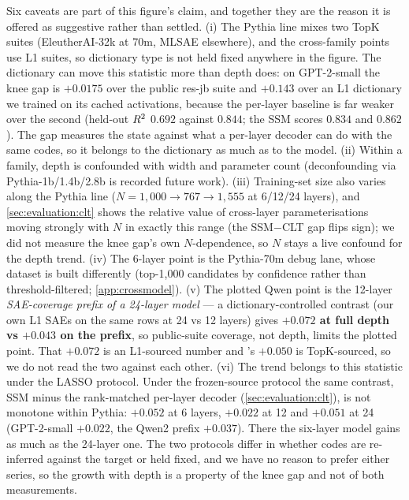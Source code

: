 Six caveats are part of this figure's claim, and together they are the reason
it is offered as suggestive rather than settled. (i) The Pythia line mixes two
TopK suites (EleutherAI-32k at 70m, MLSAE elsewhere), and the cross-family
points use L1 suites, so dictionary type is not held fixed anywhere in the
figure. The dictionary can move this statistic more than depth does: on
GPT-2-small the knee gap is $+0.0175$ over the public res-jb suite and
$+0.143$ over an L1 dictionary we trained on its cached activations, because
the per-layer baseline is far weaker over the second (held-out $R^2$ $0.692$
against $0.844$; the SSM scores $0.834$ and $0.862$). The gap measures the
state against what a per-layer decoder can do with the same codes, so it
belongs to the dictionary as much as to the model. (ii) Within a family, depth is
confounded with width and parameter count (deconfounding via
Pythia-1b/1.4b/2.8b is
recorded future work). (iii) Training-set size also varies along the Pythia
line ($N = 1{,}000 \to 767 \to 1{,}555$ at 6/12/24 layers), and
\cref{sec:evaluation:clt} shows the relative value of cross-layer
parameterisations moving strongly with $N$ in exactly this range (the
SSM$-$CLT gap flips sign); we did not measure the knee gap's own
$N$-dependence, so $N$ stays a live confound for the depth trend.
(iv) The 6-layer point is the Pythia-70m debug lane, whose dataset is built
differently (top-1{,}000 candidates by confidence rather than
threshold-filtered; \cref{app:crossmodel}). (v) The plotted Qwen point is the
12-layer \emph{SAE-coverage prefix of a 24-layer model} --- a
dictionary-controlled contrast (our own L1 SAEs on the same rows at 24 vs 12
layers) gives \textbf{$+0.072$ at full depth vs $+0.043$ on the prefix}, so
public-suite coverage, not depth, limits the plotted point. That $+0.072$ is
an L1-sourced number and \pythia{}'s $+0.050$ is TopK-sourced, so we do not
read the two against each other. (vi) The trend belongs to this statistic
under the LASSO protocol. Under the frozen-source protocol the same contrast,
SSM minus the rank-matched per-layer decoder (\cref{sec:evaluation:clt}), is
not monotone within Pythia: $+0.052$  at 6 layers,
$+0.022$  at 12 and $+0.051$ 
at 24 (GPT-2-small $+0.022$, the Qwen2 prefix $+0.037$). There the six-layer
model gains as much as the 24-layer one. The two protocols differ in whether
codes are re-inferred against the target or held fixed, and we have no reason
to prefer either series, so the growth with depth is a property of the knee
gap and not of both measurements.


